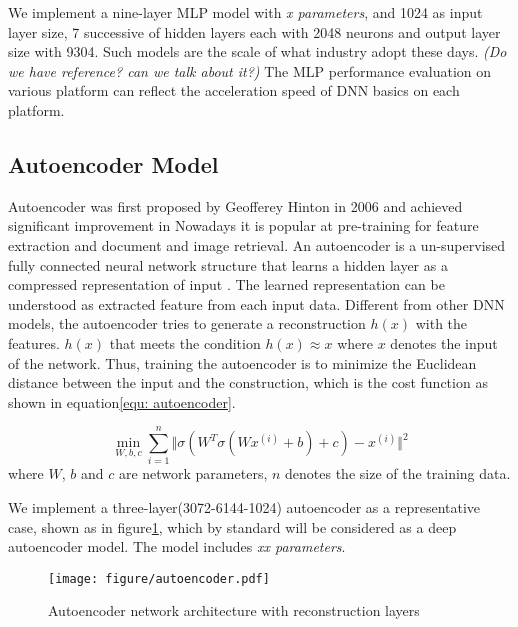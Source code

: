 \documentclass{article}
\begin{document}
We implement a nine-layer MLP model with \emph{x parameters}, and 1024 as input layer size, 7 successive of hidden layers each with 2048 neurons and output layer size with 9304.
Such models are the scale of what industry adopt these days. \emph{(Do we have reference? can we talk about it?)}
The MLP performance evaluation on various platform can reflect the acceleration speed of DNN basics on each platform.

\subsection{Autoencoder Model}
Autoencoder was first proposed by Geofferey Hinton in 2006\cite{Hinton2006} and achieved significant improvement in
Nowadays it is popular at pre-training for feature extraction and document and image retrieval.
An autoencoder is a un-supervised fully connected neural network structure that learns a hidden layer as a compressed representation of input .
The learned representation can be understood as extracted feature from each input data.
Different from other DNN models, the autoencoder tries to generate a reconstruction $h(x)$ with the features.
$h(x)$ that meets the condition $h(x)\approx x$ where $x$ denotes the input of the network.
Thus, training the autoencoder is to minimize the Euclidean distance between the input and the construction, which is the cost function as shown in equation\ref{equ: autoencoder}.

\begin{equation}
     \min\limits_{W,b,c} \sum_{i=1}^{n} \Vert \sigma(W^{T}\sigma(Wx^{(i)}+b)+c)-x^{(i)}\Vert ^{2}
     \label{equ: autoencoder}
    \end{equation}
where $W$, $b$ and $c$ are network parameters, $n$ denotes the size of the training data.


We implement a three-layer(3072-6144-1024) autoencoder as a representative case, shown as in figure\ref{fig:autoencoder}, which by standard will be considered as a deep autoencoder model.
The model includes \emph{xx parameters}.
\begin{figure}[h]
\centering
\texttt{[image: figure/autoencoder.pdf]}
\caption{Autoencoder network architecture with reconstruction layers}
\label{fig:autoencoder}
\end{figure}
\end{document}
